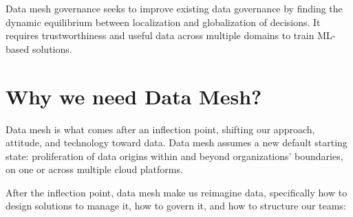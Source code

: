 \documentclass[12pt, a4paper]{book}
\begin{document}
Data mesh governance seeks to improve existing data governance by finding the dynamic equilibrium between localization and globalization of decisions. It requires trustworthiness and useful data across multiple domains to train ML-based solutions.

\section{Why we need Data Mesh?}
Data mesh is what comes after an inflection point, shifting our approach, attitude, and technology toward data. Data mesh assumes a new default starting state: proliferation of data origins within and beyond organizations’ boundaries, on one or across multiple cloud platforms.

After the inflection point, data mesh make us reimagine data, specifically how to design solutions to manage it, how to govern it, and how to structure our teams: \cite{datamesh2022p2}
\end{document}
